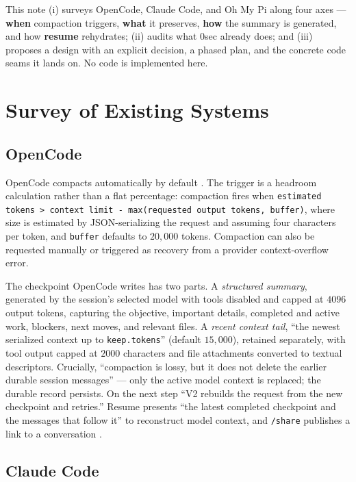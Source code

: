 \documentclass[11pt]{article}
\begin{document}
This note (i) surveys OpenCode, Claude Code, and Oh My Pi along four axes ---
\textbf{when} compaction triggers, \textbf{what} it preserves, \textbf{how} the
summary is generated, and how \textbf{resume} rehydrates; (ii) audits what 0sec
already does; and (iii) proposes a design with an explicit decision, a phased
plan, and the concrete code seams it lands on. No code is implemented here.

\section{Survey of Existing Systems}

\subsection{OpenCode}

OpenCode compacts automatically by default \cite{opencode-compaction}. The
trigger is a headroom calculation rather than a flat percentage: compaction
fires when \texttt{estimated tokens > context limit - max(requested output
tokens, buffer)}, where size is estimated by JSON-serializing the request and
assuming four characters per token, and \texttt{buffer} defaults to
$20{,}000$ tokens. Compaction can also be requested manually or triggered as
recovery from a provider context-overflow error.

The checkpoint OpenCode writes has two parts. A \emph{structured summary},
generated by the session's selected model with tools disabled and capped at
$4096$ output tokens, capturing the objective, important details, completed and
active work, blockers, next moves, and relevant files. A \emph{recent context
tail}, ``the newest serialized context up to \texttt{keep.tokens}''
(default $15{,}000$), retained separately, with tool output capped at $2000$
characters and file attachments converted to textual descriptors. Crucially,
``compaction is lossy, but it does not delete the earlier durable session
messages'' --- only the active model context is replaced; the durable record
persists. On the next step ``V2 rebuilds the request from the new checkpoint and
retries.'' Resume presents ``the latest completed checkpoint and the messages
that follow it'' to reconstruct model context, and \texttt{/share} publishes a
link to a conversation \cite{opencode-docs}.

\subsection{Claude Code}
\end{document}
